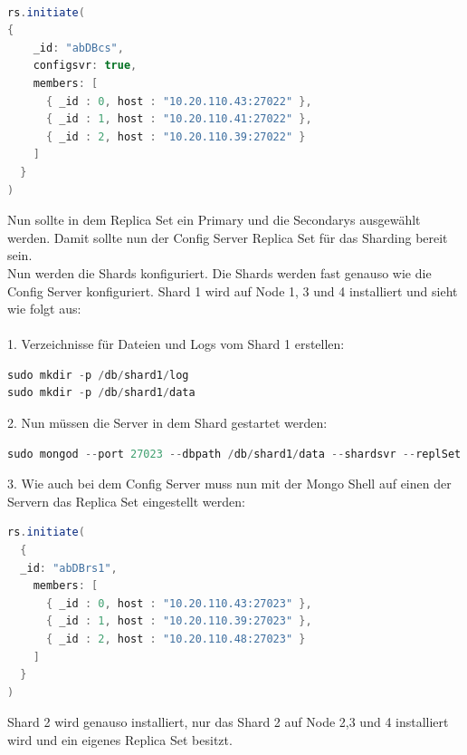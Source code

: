 \\
\begin{lstlisting}[caption={Konfiguration des Replica Sets abDBcs}, language=java,captionpos=t,numbers=none, numberstyle=\tiny,basicstyle=\scriptsize,breaklines=true]
rs.initiate( 
{ 
    _id: "abDBcs", 
    configsvr: true, 
    members: [ 
      { _id : 0, host : "10.20.110.43:27022" }, 
      { _id : 1, host : "10.20.110.41:27022" }, 
      { _id : 2, host : "10.20.110.39:27022" } 
    ] 
  } 
) 
\end{lstlisting}
Nun sollte in dem Replica Set ein Primary und die Secondarys ausgew\"ahlt werden. Damit sollte nun der Config Server Replica Set f\"ur das Sharding bereit sein.
\\
Nun werden die Shards konfiguriert. Die Shards werden fast genauso wie die Config Server konfiguriert. Shard 1 wird auf Node 1, 3 und 4 installiert und sieht wie folgt aus:
\\
\\
1.	Verzeichnisse f\"ur Dateien und Logs vom Shard 1 erstellen:
\begin{lstlisting}[caption={Verzeichnisse für Shard 1 erstellen}, language=java,captionpos=t,numbers=none, numberstyle=\tiny,basicstyle=\scriptsize,breaklines=true]
sudo mkdir -p /db/shard1/log
sudo mkdir -p /db/shard1/data 
\end{lstlisting}
2.	Nun m\"ussen die Server in dem Shard gestartet werden:
\begin{lstlisting}[caption={Einen Server für den Shard starten}, language=java,captionpos=t,numbers=none, numberstyle=\tiny,basicstyle=\scriptsize,breaklines=true]
sudo mongod --port 27023 --dbpath /db/shard1/data --shardsvr --replSet abDBrs1 --fork --logpath /db/shard1/log/mongodb.log 
\end{lstlisting}
3.	Wie auch bei dem Config Server muss nun mit der Mongo Shell auf einen der Servern das Replica Set eingestellt werden:
\begin{lstlisting}[caption={Konfiguration von dem Replica Set abDBrs1}, language=java,captionpos=t,numbers=none, numberstyle=\tiny,basicstyle=\scriptsize,breaklines=true]
rs.initiate( 
  { 
  _id: "abDBrs1", 
    members: [ 
      { _id : 0, host : "10.20.110.43:27023" }, 
      { _id : 1, host : "10.20.110.39:27023" }, 
      { _id : 2, host : "10.20.110.48:27023" } 
    ] 
  } 
) 
\end{lstlisting}
Shard 2 wird genauso installiert, nur das Shard 2 auf Node 2,3 und 4 installiert wird und ein eigenes Replica Set besitzt.
\\
